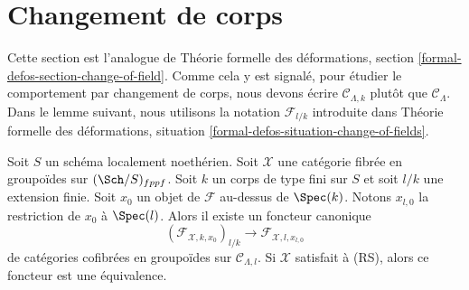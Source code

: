 \section{Changement de corps}
\label{section-change-of-field}

\noindent
Cette section est l'analogue de
Théorie formelle des déformations, section \ref{formal-defos-section-change-of-field}.
Comme cela y est signalé, pour étudier le comportement par changement de corps,
nous devons écrire $\mathcal{C}_{\Lambda, k}$ plutôt que $\mathcal{C}_\Lambda$.
Dans le lemme suivant, nous utilisons la notation $\mathcal{F}_{l/k}$
introduite dans Théorie formelle des déformations, situation
\ref{formal-defos-situation-change-of-fields}.

\begin{lemma}
\label{lemma-change-of-field}
Soit $S$ un schéma localement noethérien. Soit $\mathcal{X}$ une catégorie
fibrée en groupoïdes sur $(\Sch/S)_{fppf}$. Soit $k$ un
corps de type fini sur $S$ et soit $l/k$ une extension finie.
Soit $x_0$ un objet de $\mathcal{F}$ au-dessus de $\Spec(k)$.
Notons $x_{l, 0}$ la restriction de $x_0$ à $\Spec(l)$.
Alors il existe un foncteur canonique
$$
(\mathcal{F}_{\mathcal{X}, k , x_0})_{l/k}
\longrightarrow
\mathcal{F}_{\mathcal{X}, l, x_{l, 0}}
$$
de catégories cofibrées en groupoïdes sur $\mathcal{C}_{\Lambda, l}$.
Si $\mathcal{X}$ satisfait à (RS), alors ce foncteur est une équivalence.
\end{lemma}

